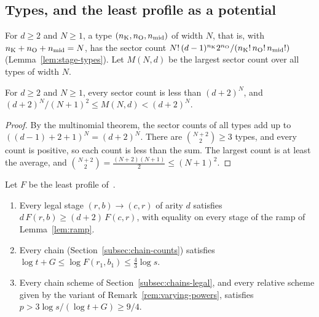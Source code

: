 \subsection{Types, and the least profile as a potential}
\label{subsec:chains-potential}

For \(d\ge2\) and \(N\ge1\), a type \((n_{\mathrm K},n_{\mathrm O},n_{\mathrm{mid}})\) of width \(N\),
that is, with \(n_{\mathrm K}+n_{\mathrm O}+n_{\mathrm{mid}}=N\), has the sector count
\(N!\,(d-1)^{n_{\mathrm K}}2^{n_{\mathrm O}}/(n_{\mathrm K}!\,n_{\mathrm O}!\,n_{\mathrm{mid}}!)\)
(Lemma~\ref{lem:stage-types}). Let \(M(N,d)\) be the largest sector
count over all types of width \(N\).

\begin{lemma}[Types]\label{lem:types}
For \(d\ge2\) and \(N\ge1\), every sector count is less than
\((d+2)^N\), and \((d+2)^N/(N+1)^2\le M(N,d)<(d+2)^N\).
\end{lemma}

\begin{proof}
By the multinomial theorem, the sector counts of all types add up to
\(((d-1)+2+1)^N=(d+2)^N\). There are \(\binom{N+2}2\ge3\) types, and
every count is positive, so each count is less than the sum. The
largest count is at least the average, and
\(\binom{N+2}2=\frac{(N+2)(N+1)}2\le(N+1)^2\).
\end{proof}

\begin{lemma}
\label{lem:profile-potential}
Let \(F\) be the least profile of~\citep[(3.4)]{FinCon26}.
\begin{enumerate}
\item[(a)] Every legal stage \((r,b)\to(c,r)\) of arity \(d\) satisfies
\(d\,F(r,b)\ge(d+2)\,F(c,r)\), with equality on every stage of the ramp
of Lemma~\ref{lem:ramp}.
\item[(b)] Every chain (Section~\ref{subsec:chain-counts}) satisfies
\(\log t+G\le\log F(r_1,b_1)\le\frac43\log s\).
\item[(c)] Every chain scheme of Section~\ref{subsec:chains-legal}, and
every relative scheme given by the variant of
Remark~\ref{rem:varying-powers}, satisfies
\(p>3\log s/(\log t+G)\ge9/4\).
\end{enumerate}
\end{lemma}

